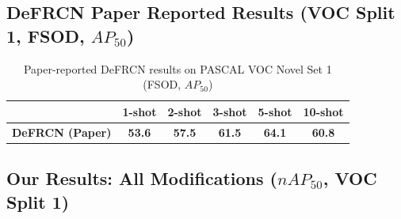 \documentclass[11pt,a4paper]{article}
\begin{document}
\subsection{DeFRCN Paper Reported Results (VOC Split 1, FSOD, $AP_{50}$)}

\begin{table}[h]
\centering
\caption{Paper-reported DeFRCN results on PASCAL VOC Novel Set 1 (FSOD, $AP_{50}$)}
\begin{tabular}{lccccc}
\toprule
& 1-shot & 2-shot & 3-shot & 5-shot & 10-shot \\
\midrule
\textbf{DeFRCN (Paper)} & \textbf{53.6} & \textbf{57.5} & \textbf{61.5} & \textbf{64.1} & \textbf{60.8} \\
\bottomrule
\end{tabular}
\end{table}

\subsection{Our Results: All Modifications ($nAP_{50}$, VOC Split 1)}
\end{document}
